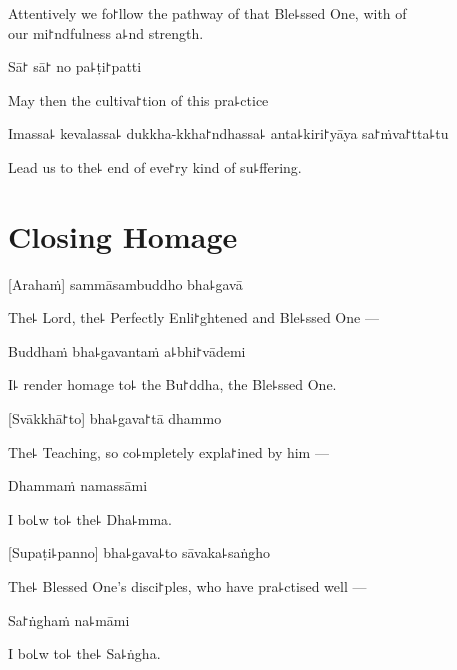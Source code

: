 \begin{english}
  Attentively we fo꜓llow the pathway of that Ble꜕ssed One, with  of \\our mi꜓ndfulness a꜕nd strength.
\end{english}

Sā꜓ sā꜓ no pa꜕ṭi꜓patti

\begin{english}
  May then the cultiva꜓tion of this pra꜕ctice
\end{english}

Imassa꜕ kevalassa꜕ dukkha-kkha꜓ndhassa꜕ anta꜕kiri꜓yāya sa꜓ṁva꜓tta꜕tu

\begin{english}
  Lead us to the꜕ end of eve꜓ry kind of su꜕ffering.
\end{english}

\clearpage

\chapter{Closing Homage}

[Arahaṁ] sammāsambuddho bha꜕gavā

\begin{english}
  The꜕ Lord, the꜕ Perfectly Enli꜓ghtened and Ble꜕ssed One ---
\end{english}

Buddhaṁ bha꜕gavantaṁ a꜕bhi꜓vādemi

\begin{english}
  I꜕ render homage to꜕ the Bu꜓ddha, the Ble꜕ssed One.
\end{english}

[Svākkhā꜓to] bha꜕gava꜓tā dhammo

\begin{english}
  The꜕ Teaching, so co꜕mpletely expla꜓ined by him ---
\end{english}

Dhammaṁ namassāmi

\begin{english}
  I bo꜖w to꜕ the꜕ Dha꜕mma.
\end{english}


[Supaṭi꜕panno] bha꜕gava꜕to sāvaka꜕saṅgho

\begin{english}
  The꜕ Blessed One's disci꜓ples, who have pra꜕ctised well ---
\end{english}

Sa꜓ṅghaṁ na꜕māmi

\begin{english}
  I bo꜖w to꜕ the꜕ Sa꜕ṅgha.
\end{english}

